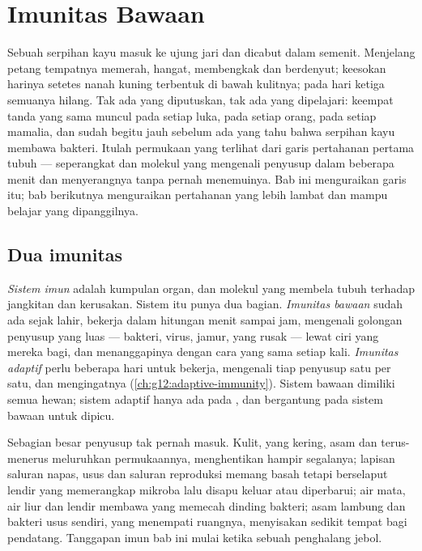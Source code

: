 \chapter{Imunitas Bawaan}\label{ch:g12:innate-immunity}

Sebuah serpihan kayu masuk ke ujung jari dan dicabut dalam semenit.
Menjelang petang tempatnya memerah, hangat, membengkak dan berdenyut;
keesokan harinya setetes nanah kuning terbentuk di bawah kulitnya; pada
hari ketiga semuanya hilang. Tak ada yang diputuskan, tak ada yang
dipelajari: keempat tanda yang sama muncul pada setiap luka, pada
setiap orang, pada setiap mamalia, dan sudah begitu jauh sebelum ada
yang tahu bahwa serpihan kayu membawa bakteri. Itulah permukaan yang
terlihat dari garis pertahanan pertama tubuh --- seperangkat  dan
molekul yang mengenali penyusup dalam beberapa menit dan menyerangnya
tanpa pernah menemuinya. Bab ini menguraikan garis itu; bab berikutnya
menguraikan pertahanan yang lebih lambat dan mampu belajar yang
dipanggilnya.

\section{Dua imunitas}

\begin{definition}\label{def:g12:innate-immunity:immunity}
\emph{Sistem imun} adalah kumpulan organ,  dan
molekul yang membela tubuh terhadap jangkitan dan kerusakan. Sistem itu
punya dua bagian. \emph{Imunitas bawaan}
sudah ada sejak lahir, bekerja dalam hitungan menit sampai jam,
mengenali golongan penyusup yang luas --- bakteri, virus, jamur, 
yang rusak --- lewat ciri yang mereka bagi, dan menanggapinya dengan
cara yang sama setiap kali. \emph{Imunitas adaptif}
perlu beberapa hari untuk bekerja, mengenali tiap penyusup satu per
satu, dan mengingatnya (\cref{ch:g12:adaptive-immunity}). Sistem bawaan
dimiliki semua hewan; sistem adaptif hanya ada pada , dan
bergantung pada sistem bawaan untuk dipicu.
\end{definition}

\begin{proposition}\label{prop:g12:innate-immunity:barriers}
Sebagian besar penyusup tak pernah masuk. Kulit, yang kering, asam dan
terus-menerus meluruhkan permukaannya, menghentikan hampir segalanya;
lapisan saluran napas, usus dan saluran reproduksi memang basah tetapi
berselaput lendir yang memerangkap mikroba lalu disapu keluar atau
diperbarui; air mata, air liur dan lendir membawa  yang memecah
dinding bakteri; asam lambung dan bakteri usus sendiri, yang menempati
ruangnya, menyisakan sedikit tempat bagi pendatang. Tanggapan imun bab
ini mulai ketika sebuah penghalang jebol.
\end{proposition}
\admitted

